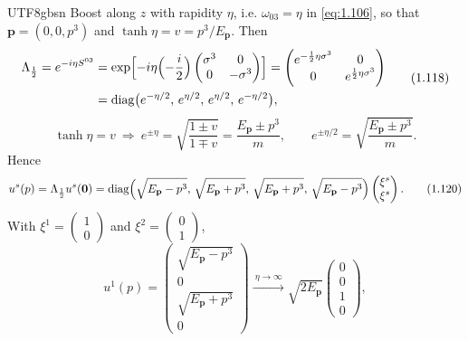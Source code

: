\documentclass[11pt,a4paper,oneside]{report}
\begin{document}
\begin{CJK*}{UTF8}{gbsn}
Boost along $z$ with rapidity $\eta$, i.e. $\omega_{03}=\eta$ in \eqref{eq:1.106}, so that $\mathbf p=(0,0,p^3)$ and $\tanh\eta=v=p^3/E_{\mathbf p}$. Then
\begin{equation*}
\begin{aligned}
\Lambda_{\frac12}=e^{-i\eta S^{03}}
&=\exp\Bigl[-i\eta\Bigl(-\frac i2\Bigr)\begin{pmatrix}\sigma^3&0\\0&-\sigma^3\end{pmatrix}\Bigr]
=\begin{pmatrix}e^{-\frac12\eta\sigma^3}&0\\0&e^{\frac12\eta\sigma^3}\end{pmatrix}\\
&=\operatorname{diag}\bigl(e^{-\eta/2},\,e^{\eta/2},\,e^{\eta/2},\,e^{-\eta/2}\bigr),
\end{aligned}
\tag{1.118}\label{eq:1.118}
\end{equation*}
\begin{equation*}
\tanh\eta=v
\ \Longrightarrow\
e^{\pm\eta}=\sqrt{\frac{1\pm v}{1\mp v}}=\frac{E_{\mathbf p}\pm p^3}{m},
\qquad
e^{\pm\eta/2}=\sqrt{\frac{E_{\mathbf p}\pm p^3}{m}}.
\tag{1.119}\label{eq:1.119}
\end{equation*}
Hence
\begin{equation*}
u^s(p)=\Lambda_{\frac12}u^s(\mathbf 0)
=\operatorname{diag}\Bigl(\sqrt{E_{\mathbf p}-p^3},\,\sqrt{E_{\mathbf p}+p^3},\,\sqrt{E_{\mathbf p}+p^3},\,\sqrt{E_{\mathbf p}-p^3}\Bigr)
\begin{pmatrix}\xi^s\\\xi^s\end{pmatrix}.
\tag{1.120}\label{eq:1.120}
\end{equation*}
With $\xi^1=\begin{pmatrix}1\\0\end{pmatrix}$ and $\xi^2=\begin{pmatrix}0\\1\end{pmatrix}$,
\begin{equation*}
u^1(p)=\begin{pmatrix}\sqrt{E_{\mathbf p}-p^3}\\0\\\sqrt{E_{\mathbf p}+p^3}\\0\end{pmatrix}
\xrightarrow{\ \eta\to\infty\ }\sqrt{2E_{\mathbf p}}\begin{pmatrix}0\\0\\1\\0\end{pmatrix},

\end{equation*}
\end{CJK*}
\end{document}
